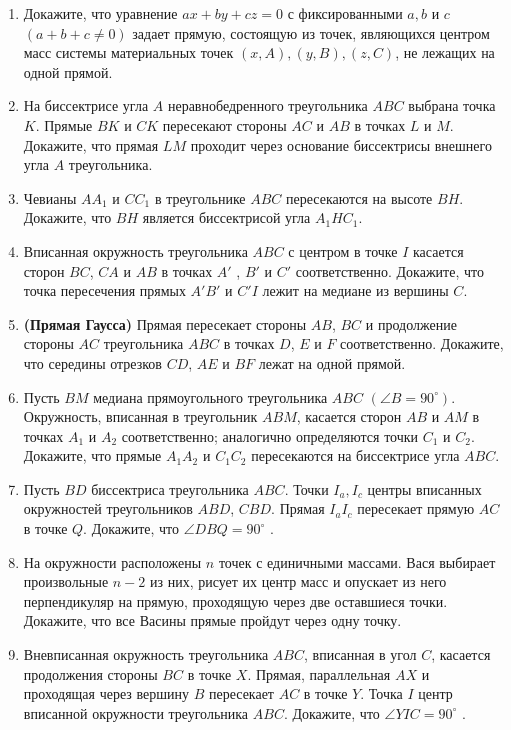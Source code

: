 \documentclass{article}
\begin{document}
\begin{enumerate}[label*=\protect\fbox{\arabic{enumi}}]
\item Докажите, что уравнение $ax + by + cz = 0$ с фиксированными $a, b$ и $c$ $(a + b + c \neq 0)$ задает прямую, состоящую из точек, являющихся центром масс системы материальных точек $(x, A), (y, B), (z, C)$, не лежащих на одной прямой.

\item На биссектрисе угла $A$ неравнобедренного треугольника $ ABC $ выбрана точка $ K $. Прямые $ BK $ и $ CK $ пересекают стороны $ AC $ и $ AB $ в точках $ L $ и $ M $. Докажите, что прямая $ LM $ проходит через основание биссектрисы внешнего угла $ A $ треугольника.

\item Чевианы $ AA_1 $ и $ CC_1 $ в треугольнике $ ABC $ пересекаются на высоте $ BH $. Докажите, что $ BH $ является биссектрисой угла $ A_1HC_1 $.
\item Вписанная окружность треугольника $ ABC $ с центром в точке $ I $ касается сторон $ BC $, $ CA $ и $ AB $ в точках $ A' $ , $ B' $  и $ C' $  соответственно. Докажите, что точка пересечения прямых $ A' B' $  и $ C' I $ лежит на медиане из вершины $ C $.
\item \textbf{(Прямая Гаусса)} Прямая пересекает стороны $ AB $, $ BC $ и продолжение стороны $ AC $ треугольника $ ABC $ в точках $ D $, $ E $ и $ F $ соответственно. Докажите, что середины отрезков $ CD $, $ AE $ и $ BF $ лежат на одной прямой.

\item Пусть $ BM $ медиана прямоугольного треугольника $ ABC $ $(\angle B = 90^{\circ} )$. Окружность, вписанная в треугольник $ABM$, касается сторон $ AB $ и $ AM $ в точках $ A_1 $ и $ A_2 $ соответственно; аналогично определяются точки $ C_1 $ и $ C_2 $. Докажите, что прямые $ A_1A_2 $ и $ C_1C_2 $ пересекаются на биссектрисе угла $ ABC $.
\item Пусть $ BD $ биссектриса треугольника $ ABC $. Точки $ I_a, I_c $ центры вписанных окружностей треугольников $ ABD $, $ CBD $. Прямая $ I_aI_c $ пересекает прямую $ AC $ в точке $ Q $. Докажите, что  $ \angle DBQ = 90^{\circ} $ .
\item На окружности расположены $ n $ точек с единичными массами. Вася выбирает произвольные $ n - 2 $ из них, рисует их центр масс и опускает из него перпендикуляр на прямую, проходящую через две оставшиеся точки. Докажите, что все Васины прямые пройдут через одну точку.
\item Вневписанная окружность треугольника $ ABC $, вписанная в угол $ C $, касается продолжения стороны $ BC $ в точке $ X $. Прямая, параллельная $ AX $ и проходящая через вершину $ B $ пересекает $ AC $ в точке $ Y $. Точка $ I $ центр вписанной окружности треугольника $ ABC $. Докажите, что $\angle YIC = 90^\circ $ .
	\end{enumerate} 
\end{document}

